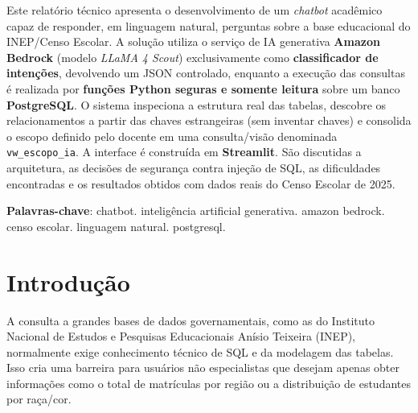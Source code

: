 \documentclass[
    12pt,
    oneside,
    a4paper,
    chapter=TITLE,
    section=TITLE
]{abntex2}
\begin{document}
\begin{resumo}

Este relatório técnico apresenta o desenvolvimento de um \textit{chatbot} acadêmico capaz de
responder, em linguagem natural, perguntas sobre a base educacional do INEP/Censo Escolar. A
solução utiliza o serviço de IA generativa \textbf{Amazon Bedrock} (modelo \textit{LLaMA 4 Scout})
exclusivamente como \textbf{classificador de intenções}, devolvendo um JSON controlado, enquanto a
execução das consultas é realizada por \textbf{funções Python seguras e somente leitura} sobre um
banco \textbf{PostgreSQL}. O sistema inspeciona a estrutura real das tabelas, descobre os
relacionamentos a partir das chaves estrangeiras (sem inventar chaves) e consolida o escopo
definido pelo docente em uma consulta/visão denominada \texttt{vw\_escopo\_ia}. A interface é
construída em \textbf{Streamlit}. São discutidas a arquitetura, as decisões de segurança contra
injeção de SQL, as dificuldades encontradas e os resultados obtidos com dados reais do Censo
Escolar de 2025.

\vspace{\onelineskip}

\noindent
\textbf{Palavras-chave}: chatbot. inteligência artificial generativa. amazon bedrock. censo escolar. linguagem natural. postgresql.

\end{resumo}

\tableofcontents*
\listoffigures*
\listoftables*

\cleardoublepage
\pagestyle{fancy}
\textual

\chapter{Introdução}

A consulta a grandes bases de dados governamentais, como as do Instituto Nacional de Estudos e
Pesquisas Educacionais Anísio Teixeira (INEP), normalmente exige conhecimento técnico de SQL e da
modelagem das tabelas. Isso cria uma barreira para usuários não especialistas que desejam apenas
obter informações como o total de matrículas por região ou a distribuição de estudantes por
raça/cor.
\end{document}

